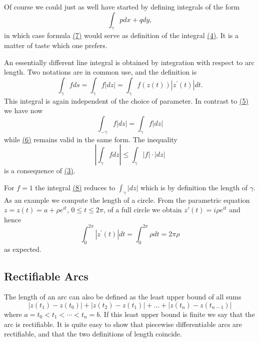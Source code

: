 Of course we could just as well have started by defining integrals of the form
\begin{equation*}
\int_ {\gamma} p d x + q d y,
\end{equation*}
in which case formula \hyperref[eq:4.7]{(7)} would serve as definition of the integral \hyperref[eq:4.4]{(4)}. It is a matter of taste which one prefers.

An essentially different line integral is obtained by integration with respect to arc length. Two notations are in common use, and the definition is
\begin{equation*}
\int_ {\gamma} f d s = \int_ {\gamma} f | d z | = \int_ {\gamma} f (z (t)) | z ^ {\prime} (t) | d t.\tag{8}\label{eq:4.8}
\end{equation*}
This integral is again independent of the choice of parameter. In contrast to \hyperref[eq:4.5]{(5)} we have now
\begin{equation*}
\int_ {- \gamma} f | d z | = \int_ {\gamma} f | d z |
\end{equation*}
while \hyperref[eq:4.6]{(6)} remains valid in the same form. The inequality
\begin{equation*}
\left| \int_ {\gamma} f d z \right| \leq \int_ {\gamma} | f | \cdot | d z |\tag{9}\label{eq:4.9}
\end{equation*}
is a consequence of \hyperref[eq:4.3]{(3)}.

For $f = 1$ the integral \hyperref[eq:4.8]{(8)} reduces to $\int_{\gamma} |dz|$ which is by definition the length of $\gamma$. As an example we compute the length of a circle. From the parametric equation $z = z(t) = a + \rho e^{it}$, $0 \leq t \leq 2\pi$, of a full circle we obtain $z'(t) = i\rho e^{it}$ and hence
\begin{equation*}
\int_ {0} ^ {2 \pi} | z ^ {\prime} (t) | d t = \int_ {0} ^ {2 \pi} \rho d t = 2 \pi \rho
\end{equation*}
as expected.

\setcounter{section}{1}\setcounter{subsection}{1}\subsection{Rectifiable Arcs}\label{sec:4.1.2}
The length of an arc can also be defined as the least upper bound of all sums
\begin{equation*}
\left| z \left(t _ {1}\right) - z \left(t _ {0}\right) \right| + \left| z \left(t _ {2}\right) - z \left(t _ {1}\right) \right| + \dots + \left| z \left(t _ {n}\right) - z \left(t _ {n - 1}\right) \right|\tag{10}\label{eq:4.10}
\end{equation*}
where $a = t_{0} < t_{1} < \cdots < t_{n} = b$. If this least upper bound is finite we say that the arc is rectifiable. It is quite easy to show that piecewise differentiable arcs are rectifiable, and that the two definitions of length coincide.


